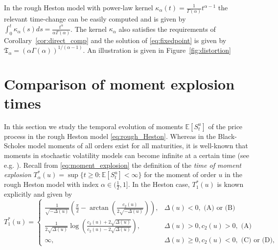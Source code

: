 \documentclass[12pt,a4paper]{amsart}
\numberwithin{equation}{section}
\numberwithin{equation}{section}
\theoremstyle{nonumberplain}
\newcommand{\EE}{\mathbb{E}}
\begin{document}
In the rough Heston model with power-law kernel $\kappa_\alpha(t) = \frac{1}{\Gamma(\alpha)}t^{\alpha-1}$ the relevant time-change can be easily computed and is given by $\int_0^t \kappa_\alpha(s)ds = \frac{t^\alpha}{\alpha \Gamma(\alpha)}$. The kernel $\kappa_\alpha$ also satisfies the requirements of Corollary~\ref{cor:direct_comp} and the solution of \eqref{eq:fixedpoint} is given by $\mathfrak{T}_\alpha = (\alpha \Gamma(\alpha))^{1/(\alpha-1)}$. An illustration is given in Figure~\ref{fig:distortion}
    
\section{Comparison of moment explosion times}
    In this section we study the temporal evolution of moments $\EE[S_t^u]$ of the price process in the rough Heston model \eqref{eq:rough_Heston}.
    Whereas in the Black-Scholes model moments of all orders exist for all maturities, it is well-known that moments in stochastic volatility models can become infinite at a certain time (see e.g. \cite{friz2010encyclopedia}). Recall from \eqref{eq:moment_explosion} the definition of the \emph{time of moment explosion} $T_{\alpha}^*(u) = \sup\{t \ge 0: \EE[S_t^u] < \infty\}$ for the moment of order $u$ in the rough Heston model with index $\alpha \in (\frac{1}{2},1]$. In the Heston case, $T_1^*(u)$ is known explicitly and given by 
\begin{equation}\label{eq:T_explicit}
	T_1^*(u) 
= \begin{cases} 
\frac{1}{\sqrt{-\Delta(u)}}\left(\frac{\pi}{2} - \arctan \left(\frac{c_2(u)}{2\sqrt{-\Delta(u)}} \right) \right), & \Delta(u)<0 , \text{ (A) or (B)}\\
\frac{1}{2\sqrt{\Delta(u)}}\log \left( \frac{c_2(u) + 2 \sqrt{\Delta(u)} }{c_2(u) -2 \sqrt{\Delta(u)}} \right), &  \Delta(u) > 0, c_2(u) > 0, \text{ (A)}\\
\infty, &  \Delta(u) \ge 0, c_2(u)<0, \text{ (C) or (D)},
\end{cases}
\end{equation}
\end{document}
